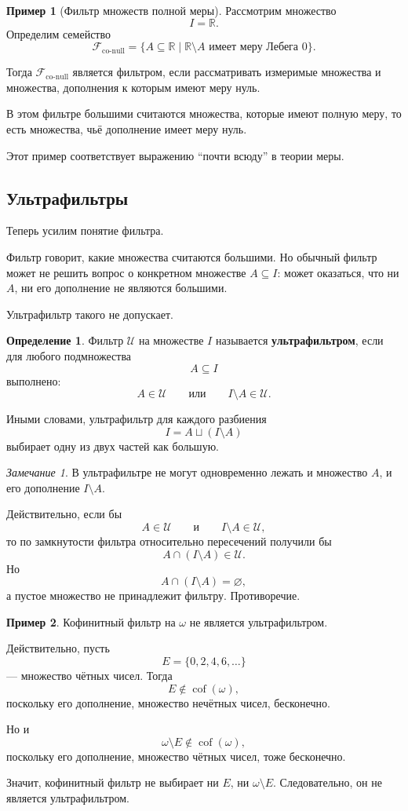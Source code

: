\documentclass[12pt,a4paper,oneside,openany]{book}
\theoremstyle{definition}
\newtheorem{definition}{Определение}[chapter]
\newtheorem{example}{Пример}[chapter]
\theoremstyle{plain}
\theoremstyle{remark}
\newtheorem{remark}{Замечание}[chapter]
\begin{document}
\begin{example}[Фильтр множеств полной меры]
Рассмотрим множество
\[
I=\mathbb R.
\]
Определим семейство
\[
\mathcal F_{\mathrm{co\text{-}null}}
=
\{A\subseteq\mathbb R\mid \mathbb R\setminus A
\text{ имеет меру Лебега }0\}.
\]

Тогда $\mathcal F_{\mathrm{co\text{-}null}}$ является фильтром, если рассматривать измеримые множества и множества, дополнения к которым имеют меру нуль.

В этом фильтре большими считаются множества, которые имеют полную меру, то есть множества, чьё дополнение имеет меру нуль.

Этот пример соответствует выражению ``почти всюду'' в теории меры.
\end{example}


\subsection{Ультрафильтры}

Теперь усилим понятие фильтра.

Фильтр говорит, какие множества считаются большими. Но обычный фильтр может не решить вопрос о конкретном множестве $A\subseteq I$: может оказаться, что ни $A$, ни его дополнение не являются большими.

Ультрафильтр такого не допускает.

\begin{definition}
Фильтр $\mathcal U$ на множестве $I$ называется \textbf{ультрафильтром}, если для любого подмножества
\[
A\subseteq I
\]
выполнено:
\[
A\in\mathcal U
\qquad
\text{или}
\qquad
I\setminus A\in\mathcal U.
\]
\end{definition}

Иными словами, ультрафильтр для каждого разбиения
\[
I=A\sqcup(I\setminus A)
\]
выбирает одну из двух частей как большую.

\begin{remark}
В ультрафильтре не могут одновременно лежать и множество $A$, и его дополнение $I\setminus A$.

Действительно, если бы
\[
A\in\mathcal U
\qquad
\text{и}
\qquad
I\setminus A\in\mathcal U,
\]
то по замкнутости фильтра относительно пересечений получили бы
\[
A\cap(I\setminus A)\in\mathcal U.
\]
Но
\[
A\cap(I\setminus A)=\varnothing,
\]
а пустое множество не принадлежит фильтру. Противоречие.
\end{remark}

\begin{example}
Кофинитный фильтр на $\omega$ не является ультрафильтром.

Действительно, пусть
\[
E=\{0,2,4,6,\ldots\}
\]
— множество чётных чисел. Тогда
\[
E\notin\operatorname{cof}(\omega),
\]
поскольку его дополнение, множество нечётных чисел, бесконечно.

Но и
\[
\omega\setminus E\notin\operatorname{cof}(\omega),
\]
поскольку его дополнение, множество чётных чисел, тоже бесконечно.

Значит, кофинитный фильтр не выбирает ни $E$, ни $\omega\setminus E$. Следовательно, он не является ультрафильтром.
\end{example}
\end{document}
